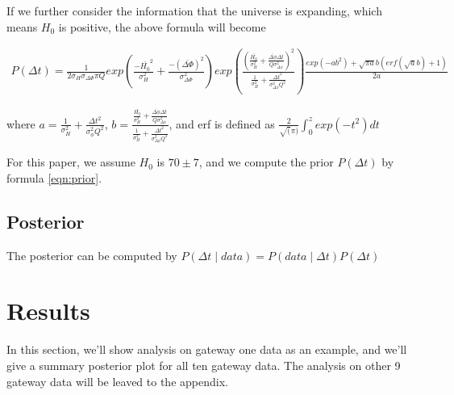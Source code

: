 \documentclass[\docopts]{\docclass}
\begin{document}
If we further consider the information that the universe is expanding, which means $H_0$ is positive, the above formula will become

\begin{align}
\label{eqn:prior}
P(\Delta t) = \frac{1}{2\sigma_{H}\sigma_{\Delta \Phi}\pi Q} exp(\frac{-\bar{H_0}^2}{\sigma_H^2}+\frac{-(\bar{\Delta \Phi})^2}{\sigma_{\Delta \Phi}^2})
exp(\frac{(\frac{\bar{H_0}}{\sigma_H^2}+\frac{\bar{\Delta \phi}\Delta t}{Q\sigma_{\Delta \phi}^2})^2}{\frac{1}{\sigma_H^2}+\frac{\Delta t^2}{\sigma_{\Delta \phi}^2 Q^2}}) \frac{exp(-ab^2)+\sqrt{\pi a}b(erf(\sqrt{a}b)+1)}{2a} 
\end{align}

 where $a=\frac{1}{\sigma_H^2}+\frac{\Delta t^2}{\sigma_\phi^2Q^2}$, $b=\frac{\frac{\bar{H_0}}{\sigma_H^2}+\frac{\bar{\Delta \phi}\Delta t}{Q\sigma_{\Delta \phi}^2}}{\frac{1}{\sigma_H^2}+\frac{\Delta t^2}{\sigma_{\Delta\phi}^2 Q^2}}$, and erf is defined as $\frac{2}{\sqrt(\pi)}\int_0^z exp(-t^2) dt$

For this paper, we assume $H_0$ is $70 \pm 7$, and we compute the prior $P(\Delta t)$ by formula \ref{eqn:prior}. 

\subsection{Posterior}
The posterior can be computed by 
$P(\Delta t \mid data) = P(data \mid \Delta t) P(\Delta t)$

\section{Results}
\label{sec:results}
In this section, we'll show analysis on gateway one data as an example, and we'll give a summary posterior plot for all ten gateway data. The analysis on other 9 gateway data  will be leaved to the appendix. 
\end{document}
